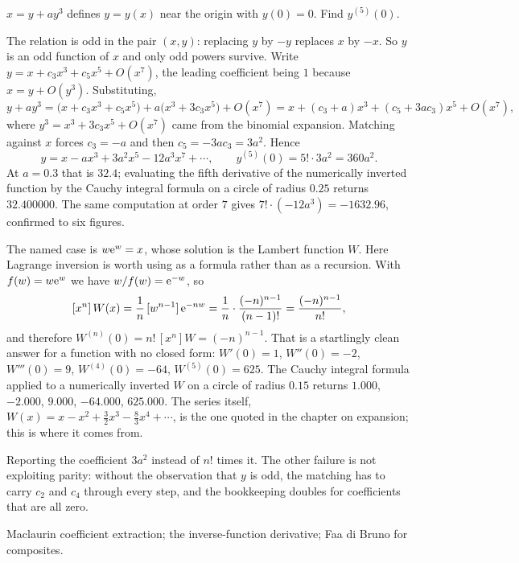 \begin{worked}
$x=y+ay^{3}$ defines $y=y(x)$ near the origin with $y(0)=0$. Find $y^{(5)}(0)$.

The relation is odd in the pair $(x,y)$: replacing $y$ by $-y$ replaces $x$ by $-x$. So $y$ is an odd function of $x$ and only odd powers survive. Write $y=x+c_{3}x^{3}+c_{5}x^{5}+O(x^{7})$, the leading coefficient being $1$ because $x=y+O(y^{3})$. Substituting,
\[
y+ay^{3}=\bigl(x+c_{3}x^{3}+c_{5}x^{5}\bigr)+a\bigl(x^{3}+3c_{3}x^{5}\bigr)+O(x^{7})
=x+(c_{3}+a)x^{3}+(c_{5}+3ac_{3})x^{5}+O(x^{7}),
\]
where $y^{3}=x^{3}+3c_{3}x^{5}+O(x^{7})$ came from the binomial expansion. Matching against $x$ forces $c_{3}=-a$ and then $c_{5}=-3ac_{3}=3a^{2}$. Hence
\[
y=x-ax^{3}+3a^{2}x^{5}-12a^{3}x^{7}+\cdots,\qquad y^{(5)}(0)=5!\cdot3a^{2}=360a^{2}.
\]
At $a=0.3$ that is $32.4$; evaluating the fifth derivative of the numerically inverted function by the Cauchy integral formula on a circle of radius $0.25$ returns $32.400000$. The same computation at order $7$ gives $7!\cdot(-12a^{3})=-1632.96$, confirmed to six figures.

The named case is $w\mathrm{e}^{w}=x$, whose solution is the Lambert function $W$. Here Lagrange inversion is worth using as a formula rather than as a recursion. With $f(w)=w\mathrm{e}^{w}$ we have $w/f(w)=\mathrm{e}^{-w}$, so
\[
[x^{n}]\,W(x)=\frac1n\,[w^{n-1}]\,\mathrm{e}^{-nw}=\frac1n\cdot\frac{(-n)^{n-1}}{(n-1)!}=\frac{(-n)^{n-1}}{n!},
\]
and therefore $W^{(n)}(0)=n!\,[x^{n}]W=(-n)^{n-1}$. That is a startlingly clean answer for a function with no closed form: $W'(0)=1$, $W''(0)=-2$, $W'''(0)=9$, $W^{(4)}(0)=-64$, $W^{(5)}(0)=625$. The Cauchy integral formula applied to a numerically inverted $W$ on a circle of radius $0.15$ returns $1.000$, $-2.000$, $9.000$, $-64.000$, $625.000$. The series itself, $W(x)=x-x^{2}+\tfrac32x^{3}-\tfrac83x^{4}+\cdots$, is the one quoted in the chapter on expansion; this is where it comes from.
\end{worked}

\begin{trap}
Reporting the coefficient $3a^{2}$ instead of $n!$ times it. The other failure is not exploiting parity: without the observation that $y$ is odd, the matching has to carry $c_{2}$ and $c_{4}$ through every step, and the bookkeeping doubles for coefficients that are all zero.
\end{trap}

\begin{seealsob}Maclaurin coefficient extraction; the inverse-function derivative; Faa di Bruno for composites.\end{seealsob}

